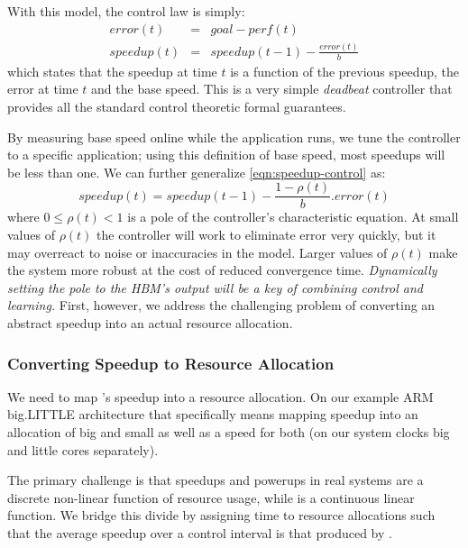 With this model, the control law is simply:
\begin{eqnarray}
  error(t) &=& goal - perf(t) \label{eqn:speedup-error} \\
  speedup(t) &=& speedup(t-1) - \frac{error(t)}{b}
  \label{eqn:speedup-control}
\end{eqnarray}
which states that the speedup at time $t$ is a function of the
previous speedup, the error at time $t$ and the base speed.  This is a
very simple \emph{deadbeat} controller that provides all the standard
control theoretic formal guarantees.


By measuring base speed online while the application runs, we tune the
controller to a specific application; using this definition of base
speed, most speedups will be less than one.  We can further generalize
\eqref{eqn:speedup-control} as:
\begin{equation}
speedup(t) = speedup(t-1) - \frac{1 - \rho(t)}{b}.error(t)
\end{equation}
where $0 \le \rho(t) < 1$ is a pole of the controller's characteristic
equation.  At small values of $\rho(t)$ the controller will work to
eliminate error very quickly, but it may overreact to noise or
inaccuracies in the model.  Larger values of $\rho(t)$ make the system more
robust at the cost of reduced convergence time.  \emph{Dynamically
  setting the pole to the HBM's output will be a key of combining
  control and learning.} First, however, we address the challenging
problem of converting an abstract speedup into an actual resource
allocation.


\subsubsection{Converting Speedup to Resource Allocation}
We need to map 's speedup into a resource
allocation.  On our example ARM big.LITTLE architecture that
specifically means mapping speedup into an allocation of big and small
as well as a speed for both (on our system clocks big and little cores
separately).

The primary challenge is that speedups and powerups in real systems are a discrete non-linear
function of resource usage, while
 is a continuous linear function.  We bridge
this divide by assigning time to resource allocations such that the
average speedup over a control interval is that produced by
.

